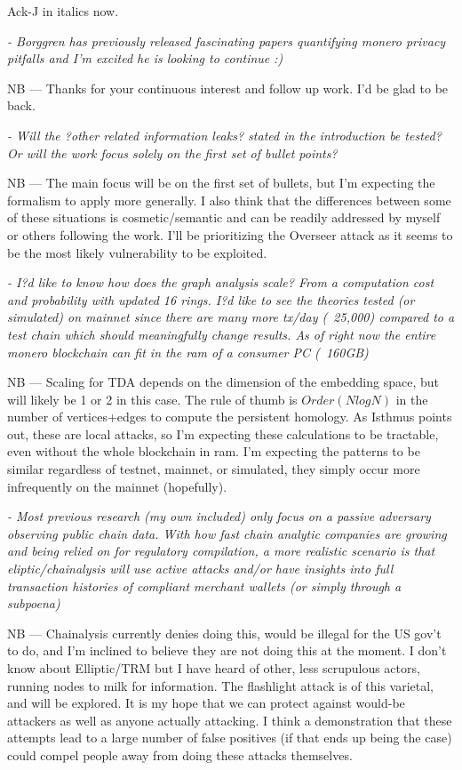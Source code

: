 \documentclass[prc, 12pt]{revtex4-1}
\begin{document}
Ack-J in italics now.

\textit{- Borggren has previously released fascinating papers quantifying monero privacy pitfalls and I'm excited he is looking to continue :)}

NB --- Thanks for your continuous interest and follow up work.  I'd be glad to be back.

\textit{- Will the ?other related information leaks? stated in the introduction be tested? Or will the work focus solely on the first set of bullet points?}

NB --- The main focus will be on the first set of bullets, but I'm expecting the formalism to apply more generally.  I also think that the differences between some of these situations is cosmetic/semantic and can be readily addressed by myself or others following the work.  I'll be prioritizing the Overseer attack as it seems to be the most likely vulnerability to be exploited.

\textit{- I?d like to know how does the graph analysis scale? From a computation cost and probability with updated 16 rings. I?d like to see the theories tested (or simulated) on mainnet since there are many more tx/day (~25,000) compared to a test chain which should meaningfully change results. As of right now the entire monero blockchain can fit in the ram of a consumer PC (~160GB)}

NB --- Scaling for TDA depends on the dimension of the embedding space, but will likely be 1 or 2 in this case.  The rule of thumb is $Order(N log N)$ in the number of vertices+edges to compute the persistent homology.  As Isthmus points out, these are local attacks, so I'm expecting these calculations to be tractable, even without the whole blockchain in ram.  I'm expecting the patterns to be similar regardless of testnet, mainnet, or simulated, they simply occur more infrequently on the mainnet (hopefully).

\textit{- Most previous research (my own included) only focus on a passive adversary observing public chain data. With how fast chain analytic companies are growing and being relied on for regulatory compilation, a more realistic scenario is that eliptic/chainalysis will use active attacks and/or have insights into full transaction histories of compliant merchant wallets (or simply through a subpoena)}

NB --- Chainalysis currently denies doing this, would be illegal for the US gov't to do, and I'm inclined to believe they are not doing this at the moment.  I don't know about Elliptic/TRM but I have heard of other, less scrupulous actors, running nodes to milk for information.  The flashlight attack is of this varietal, and will be explored.  It is my hope that we can protect against would-be attackers as well as anyone actually attacking.  I think a demonstration that these attempts lead to a large number of false positives (if that ends up being the case) could compel people away from doing these attacks themselves. 
\end{document}
